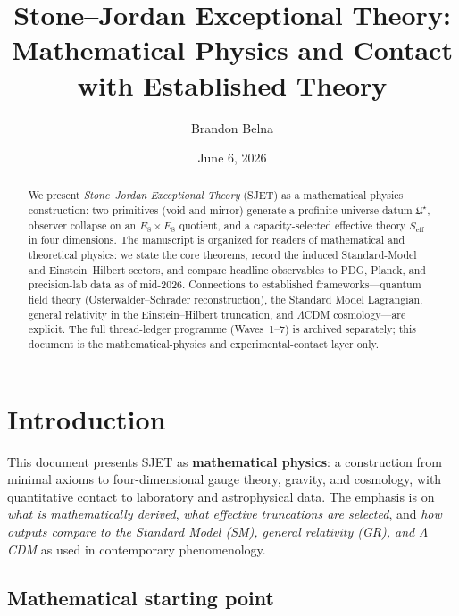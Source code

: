 \documentclass[11pt]{article}
\title{Stone--Jordan Exceptional Theory:\\[0.3em]
\large Mathematical Physics and Contact with Established Theory}
\author{Brandon Belna}
\date{June 6, 2026}
\theoremstyle{plain}
\theoremstyle{definition}
\theoremstyle{remark}
\numberwithin{equation}{section}
\begin{document}
\maketitle

\begin{abstract}
We present \emph{Stone--Jordan Exceptional Theory} (SJET) as a mathematical
physics construction: two primitives (void and mirror) generate a profinite
universe datum $\mathfrak{U}^\star$, observer collapse on an $E_8\times E_8$
quotient, and a capacity-selected effective theory $S_{\mathrm{eff}}$ in four
dimensions. The manuscript is organized for readers of mathematical and
theoretical physics: we state the core theorems, record the induced
Standard-Model and Einstein--Hilbert sectors, and compare headline observables
to PDG, Planck, and precision-lab data as of mid-2026. Connections to
established frameworks---quantum field theory (Osterwalder--Schrader
reconstruction), the Standard Model Lagrangian, general relativity in the
Einstein--Hilbert truncation, and $\Lambda$CDM cosmology---are explicit. The
full thread-ledger programme (Waves~1--7) is archived separately; this document
is the mathematical-physics and experimental-contact layer only.
\end{abstract}

\tableofcontents
\clearpage%
\section{Introduction}
\label{sec:intro}

This document presents SJET as \textbf{mathematical physics}: a construction
from minimal axioms to four-dimensional gauge theory, gravity, and cosmology,
with quantitative contact to laboratory and astrophysical data. The emphasis is
on \emph{what is mathematically derived}, \emph{what effective truncations are
selected}, and \emph{how outputs compare to the Standard Model (SM),
general relativity (GR), and $\Lambda$CDM} as used in contemporary phenomenology.

\subsection{Mathematical starting point}
\end{document}
